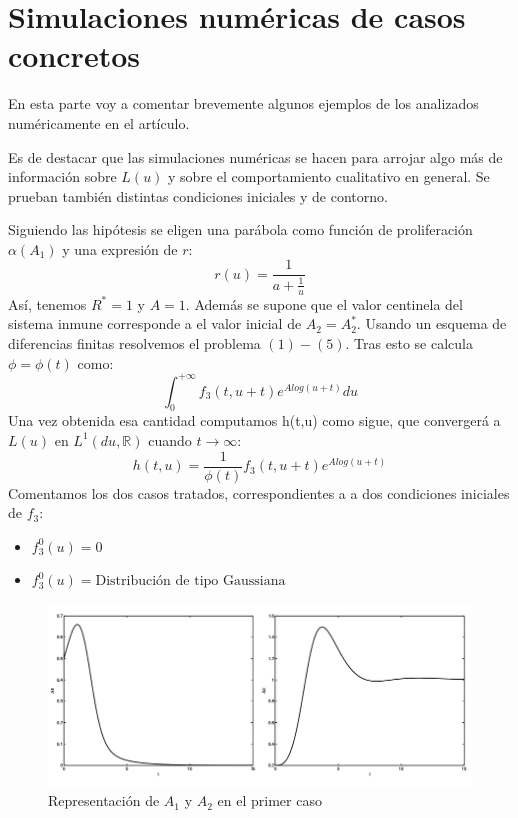 \documentclass[1p]{elsarticle}
\begin{document}
\section{Simulaciones numéricas de casos concretos}
En esta parte voy a comentar brevemente algunos ejemplos de los analizados numéricamente en el artículo. 

Es de destacar que las simulaciones numéricas se hacen para arrojar algo más de información sobre $L(u)$ y sobre el comportamiento cualitativo en general. Se prueban también distintas condiciones iniciales y de contorno. 

Siguiendo las hipótesis se eligen una parábola como función de proliferación $\alpha(A_1)$ y una expresión de $r$:
$$r(u)=\frac{1}{a+\frac{1}{u}}$$
Así, tenemos $R^*=1$ y $A=1$. Además se supone que el valor centinela del sistema inmune corresponde a el valor inicial de $A_2=A_2^*$.
Usando un esquema de diferencias finitas resolvemos el problema $(1)-(5)$. Tras esto se calcula $\phi=\phi(t)$ como:
$$\int_{0}^{+\infty}f_3(t,u+t)e^{Alog(u+t)}du$$
Una vez obtenida esa cantidad computamos h(t,u) como sigue, que convergerá a $L(u)$ en $L^1(du,\mathbb{R})$ cuando $t\rightarrow\infty$:
$$h(t,u)=\frac{1}{\phi(t)}f_3(t,u+t)e^{Alog(u+t)}$$
Comentamos los dos casos tratados, correspondientes a a dos condiciones iniciales de $f_3$:
\begin{itemize}
	\item $f_3^0(u)=0$
	\item $f_3^0(u)=\text{Distribución de tipo Gaussiana}$
\end{itemize}
\begin{figure}
	\centering
	\includegraphics[width=1\textwidth]{test1A1A2.png}
	\caption{Representación de $A_1$ y $A_2$ en el primer caso}
	\label{fig:ejemplo2}
\end{figure}
\end{document}
